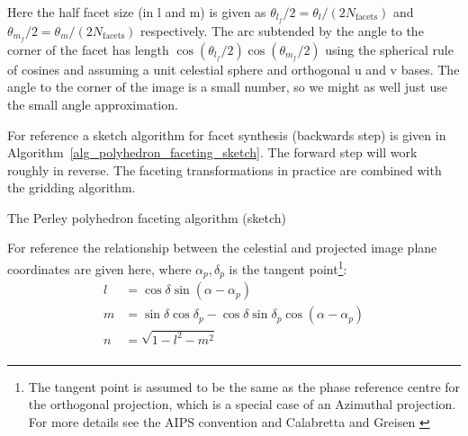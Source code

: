 Here the half facet size (in l and m) is given as $\theta_{l_f}/2 = \theta_l/(2N_{\text{facets}})$ and $\theta_{m_f}/2 = \theta_m/(2N_{\text{facets}})$ respectively. The arc subtended by the angle to the corner of the facet has 
length $\cos{(\theta_{l_f}/2)}\cos{(\theta_{m_f}/2)}$ using the spherical rule of cosines and assuming a unit celestial sphere and orthogonal u and v bases. The angle to the corner of the image is a small number, so 
we might as well just use the small angle approximation.

For reference a sketch algorithm for facet synthesis (backwards step) is given in Algorithm~\ref{alg_polyhedron_faceting_sketch}. The forward
step will work roughly in reverse. The faceting transformations in practice are combined with the gridding algorithm.
\begin{algorithm}
  \begin{algorithmic}
    \ENDFOR
  \ENDFOR
  \end{algorithmic}
  \caption{The Perley polyhedron faceting algorithm (sketch)}
  \label{alg_polyhedron_faceting_sketch}
\end{algorithm}

For reference the relationship between the celestial and projected image plane coordinates are given here, where
$\alpha_p,\delta_p$ is the tangent point\footnote{The tangent point is assumed to be the same as the phase reference 
centre for the orthogonal projection, which is a special case of an Azimuthal projection. For more details see the 
AIPS convention \cite{aipsnonlinearcoords} and Calabretta and Greisen \cite{calabretta2002representations}}:
\begin{equation}
 \begin{split}
  l &= \cos{\delta}\sin{(\alpha-\alpha_p)}\\
  m &= \sin{\delta}\cos{\delta_p}-\cos{\delta}\sin{\delta_p}\cos{(\alpha-\alpha_p)}\\
  n &= \sqrt{1-l^2-m^2}\\
 \end{split}
\end{equation}

